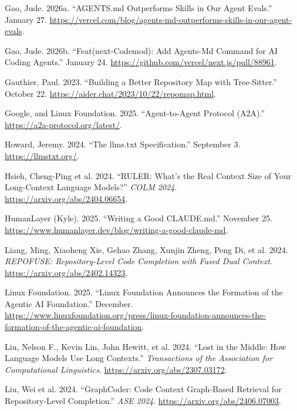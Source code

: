 \documentclass[
  11pt,
  letterpaper,
  numbers=noendperiod,
  parskip=half]{scrartcl}
\newlength{\cslhangindent}
\newenvironment{CSLReferences}[2] %
 {\begin{list}{}{%
  \setlength{\itemindent}{0pt}
  \setlength{\leftmargin}{0pt}
  \setlength{\parsep}{0pt}
  \ifodd #1
   \setlength{\leftmargin}{\cslhangindent}
   \setlength{\itemindent}{-1\cslhangindent}
  \fi
  \setlength{\itemsep}{#2\baselineskip}}}
 {\end{list}}
\begin{document}
\begin{CSLReferences}{1}{1}
Gao, Jude. 2026a. {``{AGENTS.md} Outperforms Skills in Our Agent
Evals.''} January 27.
\url{https://vercel.com/blog/agents-md-outperforms-skills-in-our-agent-evals}.

Gao, Jude. 2026b. {``Feat(next-Codemod): Add Agents-Md Command for {AI}
Coding Agents.''} January 24.
\url{https://github.com/vercel/next.js/pull/88961}.

Gauthier, Paul. 2023. {``Building a Better Repository Map with
Tree-Sitter.''} October 22.
\url{https://aider.chat/2023/10/22/repomap.html}.

Google, and Linux Foundation. 2025. {``Agent-to-Agent Protocol
({A2A}).''} \url{https://a2a-protocol.org/latest/}.

Howard, Jeremy. 2024. {``The {llms.txt} Specification.''} September 3.
\url{https://llmstxt.org/}.

{Hsieh, Cheng-Ping et al.} 2024. {``{RULER}: What's the Real Context
Size of Your Long-Context Language Models?''} \emph{COLM 2024}.
\url{https://arxiv.org/abs/2404.06654}.

HumanLayer (Kyle). 2025. {``Writing a Good {CLAUDE.md}.''} November 25.
\url{https://www.humanlayer.dev/blog/writing-a-good-claude-md}.

{Liang, Ming, Xiaoheng Xie, Gehao Zhang, Xunjin Zheng, Peng Di, et al.}
2024. \emph{{REPOFUSE}: Repository-Level Code Completion with Fused Dual
Context}. \url{https://arxiv.org/abs/2402.14323}.

Linux Foundation. 2025. {``{Linux Foundation} Announces the Formation of
the {Agentic AI Foundation}.''} December.
\url{https://www.linuxfoundation.org/press/linux-foundation-announces-the-formation-of-the-agentic-ai-foundation}.

Liu, Nelson F., Kevin Lin, John Hewitt, et al. 2024. {``Lost in the
Middle: How Language Models Use Long Contexts.''} \emph{Transactions of
the Association for Computational Linguistics}.
\url{https://arxiv.org/abs/2307.03172}.

{Liu, Wei et al.} 2024. {``{GraphCoder}: Code Context Graph-Based
Retrieval for Repository-Level Completion.''} \emph{ASE 2024}.
\url{https://arxiv.org/abs/2406.07003}.


\end{CSLReferences}
\end{document}
